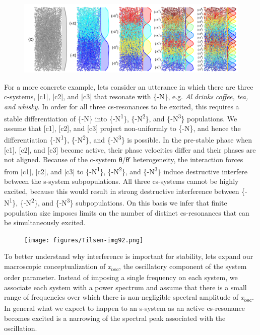   
\begin{figure}
\includegraphics[width=\textwidth]{figures/Tilsen-img91.png}
\caption{\missingcaption}
\label{fig:}
\end{figure}
 

  For a more concrete example, lets consider an utterance in which there are three c-systems, [c1], [c2], and [c3] that resonate with \{-N\}, e.g. \textit{Al} \textit{drinks} \textit{coffee,} \textit{tea,} \textit{and} \textit{whisky}. In order for all three cs-resonances to be excited, this requires a stable differentiation of \{-N\} into \{-N\textsuperscript{1}\}, \{-N\textsuperscript{2}\}, and \{-N\textsuperscript{3}\} populations. We assume that [c1], [c2], and [c3] project non-uniformly to \{-N\}, and hence the differentiation \{-N\textsuperscript{1}\}, \{-N\textsuperscript{2}\}, and \{-N\textsuperscript{3}\} is possible. In the pre-stable phase when [c1], [c2], and [c3] become active, their phase velocities differ and their phases are not aligned. Because of the c-system θ/θ′ heterogeneity, the interaction forces from [c1], [c2], and [c3] to \{-N\textsuperscript{1}\}, \{-N\textsuperscript{2}\}, and \{-N\textsuperscript{3}\} induce destructive interfere between the s-system subpopulations. All three cs-systems cannot be highly excited, because this would result in strong destructive interference between \{-N\textsuperscript{1}\}, \{-N\textsuperscript{2}\}, and \{-N\textsuperscript{3}\} subpopulations. On this basis we infer that finite population size imposes limits on the number of distinct cs-resonances that can be simultaneously excited.

  
\begin{figure}
\texttt{[image: figures/Tilsen-img92.png]}
\caption{\missingcaption}
\label{fig:}
\end{figure}
 

  To better understand why interference is important for stability, lets expand our macroscopic conceptualization of \textit{x}\textsubscript{osc}, the oscillatory component of the system order parameter. Instead of imposing a single frequency on each system, we associate each system with a power spectrum and assume that there is a small range of frequencies over which there is non-negligible spectral amplitude of \textit{x}\textsubscript{osc}. In general what we expect to happen to an s-system as an active cs-resonance becomes excited is a narrowing of the spectral peak associated with the oscillation.

